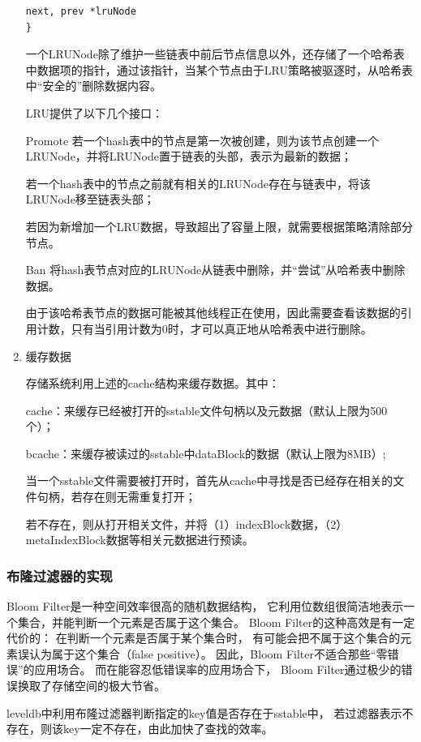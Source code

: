 \begin{enumerate}
\begin{lstlisting}[caption=lruNode , label=code_radds_storage_lruNode]
	next, prev *lruNode
}
\end{lstlisting}

一个LRUNode除了维护一些链表中前后节点信息以外，还存储了一个哈希表中数据项的指针，通过该指针，当某个节点由于LRU策略被驱逐时，从哈希表中“安全的”删除数据内容。

LRU提供了以下几个接口：

Promote
若一个hash表中的节点是第一次被创建，则为该节点创建一个LRUNode，并将LRUNode置于链表的头部，表示为最新的数据；

若一个hash表中的节点之前就有相关的LRUNode存在与链表中，将该LRUNode移至链表头部；

若因为新增加一个LRU数据，导致超出了容量上限，就需要根据策略清除部分节点。

Ban
将hash表节点对应的LRUNode从链表中删除，并“尝试”从哈希表中删除数据。

由于该哈希表节点的数据可能被其他线程正在使用，因此需要查看该数据的引用计数，只有当引用计数为0时，才可以真正地从哈希表中进行删除。

		\item 缓存数据 
		
		存储系统利用上述的cache结构来缓存数据。其中：

cache：来缓存已经被打开的sstable文件句柄以及元数据（默认上限为500个）；

bcache：来缓存被读过的sstable中dataBlock的数据（默认上限为8MB）;

当一个sstable文件需要被打开时，首先从cache中寻找是否已经存在相关的文件句柄，若存在则无需重复打开；

若不存在，则从打开相关文件，并将（1）indexBlock数据，（2）metaIndexBlock数据等相关元数据进行预读。

		\end{enumerate}
		

		\subsubsection{布隆过滤器的实现}


		Bloom Filter是一种空间效率很高的随机数据结构，
		它利用位数组很简洁地表示一个集合，并能判断一个元素是否属于这个集合。
		Bloom Filter的这种高效是有一定代价的：
		在判断一个元素是否属于某个集合时，
		有可能会把不属于这个集合的元素误认为属于这个集合（false positive）。
		因此，Bloom Filter不适合那些“零错误”的应用场合。
		而在能容忍低错误率的应用场合下，
		Bloom Filter通过极少的错误换取了存储空间的极大节省。

leveldb中利用布隆过滤器判断指定的key值是否存在于sstable中，
若过滤器表示不存在，则该key一定不存在，由此加快了查找的效率。

